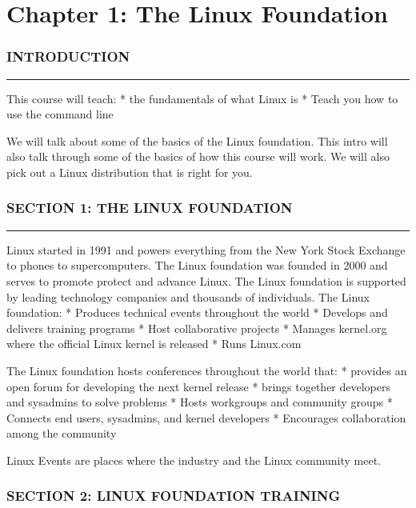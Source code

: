 \section{Chapter 1: The Linux
Foundation}\label{chapter-1-the-linux-foundation}

\subsubsection{INTRODUCTION}\label{introduction}

\begin{center}\rule{3in}{0.4pt}\end{center}

This course will teach: * the fundamentals of what Linux is * Teach you
how to use the command line

We will talk about some of the basics of the Linux foundation. This
intro will also talk through some of the basics of how this course will
work. We will also pick out a Linux distribution that is right for you.

\subsubsection{SECTION 1: THE LINUX
FOUNDATION}\label{section-1-the-linux-foundation}

\begin{center}\rule{3in}{0.4pt}\end{center}

Linux started in 1991 and powers everything from the New York Stock
Exchange to phones to supercomputers. The Linux foundation was founded
in 2000 and serves to promote protect and advance Linux. The Linux
foundation is supported by leading technology companies and thousands of
individuals. The Linux foundation: * Produces technical events
throughout the world * Develops and delivers training programs * Host
collaborative projects * Manages kernel.org where the official Linux
kernel is released * Runs Linux.com

The Linux foundation hosts conferences throughout the world that: *
provides an open forum for developing the next kernel release * brings
together developers and sysadmins to solve problems * Hosts workgroups
and community groups * Connects end users, sysadmins, and kernel
developers * Encourages collaboration among the community

Linux Events are places where the industry and the Linux community meet.

\subsubsection{SECTION 2: LINUX FOUNDATION
TRAINING}\label{section-2-linux-foundation-training}

